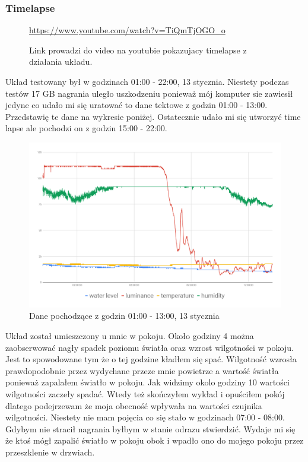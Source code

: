 \documentclass[a4paper,11pt]{uzreport}
\begin{document}
\subsubsection{Timelapse}
\begin{figure}[!h]
    \centering
      \href{https://www.youtube.com/watch?v=TiQmTjOGO_o}{https://www.youtube.com/watch?v=TiQmTjOGO_o}
    \captionsetup{labelformat=empty}
    \caption{Link prowadzi do video na youtubie pokazujacy timelapse z działania układu.}
    \label{fig:link}
\end{figure}
    Układ testowany był w godzinach 01:00 - 22:00, 13 stycznia. Niestety podczas testów 17 GB nagrania uległo uszkodzeniu ponieważ mój komputer sie zawiesił jedyne co udało mi się uratować to dane tektowe z godzin 01:00 - 13:00. Przedstawię te dane na wykresie poniżej. Ostatecznie udało mi się utworzyć time lapse ale pochodzi on z godzin 15:00 - 22:00.\\
    \begin{figure}[!h]
        \centering
        \includegraphics[width=\linewidth]{listings/chart .png}
        \caption{Dane pochodzące z godzin 01:00 - 13:00, 13 stycznia}
        \label{fig:my_label}
    \end{figure}
    Układ został umieszczony u mnie w pokoju. Około godziny 4 można zaobserwować nagły spadek poziomu światła oraz wzrost wilgotności w pokoju. Jest to spowodowane tym że o tej godzine kładłem się spać. Wilgotność wzrosła prawdopodobnie przez wydychane przeze mnie powietrze a wartość światła ponieważ zapalałem światło w pokoju. Jak widzimy okolo godziny 10 wartości wilgotności zaczeły spadać. Wtedy też skończyłem wykład i opuściłem pokój dlatego podejrzewam że moja obecność wpływała na wartości czujnika wilgotności. Niestety nie mam pojęcia co się stało w godzinach 07:00 - 08:00. Gdybym nie stracił nagrania byłbym w stanie odrazu stwierdzić. Wydaje mi się że ktoś mógł zapalić światło w pokoju obok i wpadło ono do mojego pokoju przez przeszklenie w drzwiach.
\end{document}
